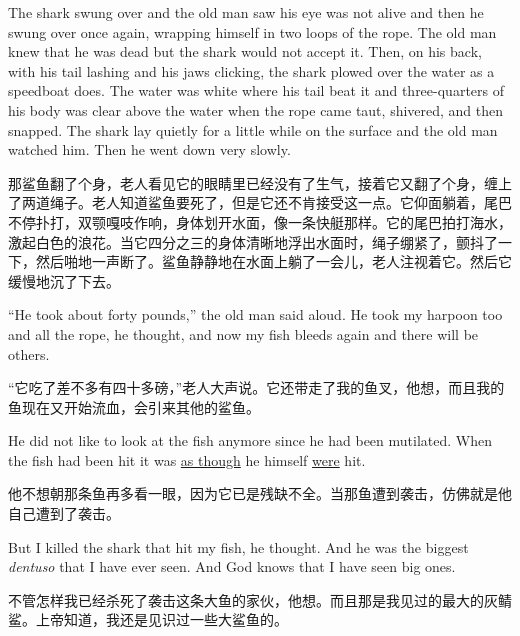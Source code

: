 \begin{paracol}{2}
\switchcolumn*

The shark swung over and the old man saw his eye was not alive and then he
swung over once again, wrapping himself in two loops of the rope. The old
man knew that he was dead but the shark would not accept it. Then, on his
back, with his tail lashing and his jaws clicking, the shark \gls{plowed}
over the water as a \gls{speedboat} does. The water was white where his tail
beat it and three-\glspl{quarter} of his body was clear above the water when the
rope came taut, \gls{shivered}, and then \gls{snapped}. The shark lay
quietly for a little while on the surface and the old man watched him. Then
he went down very slowly.

\switchcolumn

那鲨鱼翻了个身，老人看见它的眼睛里已经没有了生气，接着它又翻了个身，缠上了两道绳子。老人知道鲨鱼要死了，但是它还不肯接受这一点。它仰面躺着，尾巴不停扑打，双颚嘎吱作响，身体划开水面，像一条快艇那样。它的尾巴拍打海水，激起白色的浪花。当它四分之三的身体清晰地浮出水面时，绳子绷紧了，颤抖了一下，然后啪地一声断了。鲨鱼静静地在水面上躺了一会儿，老人注视着它。然后它缓慢地沉了下去。

\switchcolumn*

``He took about forty pounds,'' the old man said aloud. He took my harpoon
too and all the rope, he thought, and now my fish bleeds again and there
will be others.

\switchcolumn

“它吃了差不多有四十多磅，”老人大声说。它还带走了我的鱼叉，他想，而且我的鱼现在又开始流血，会引来其他的鲨鱼。

\switchcolumn*

He did not like to look at the fish anymore since he had been
\gls{mutilated}. When the fish had been hit it was \uline{as though} he himself
\uline{were} hit.

\switchcolumn

他不想朝那条鱼再多看一眼，因为它已是残缺不全。当那鱼遭到袭击，仿佛就是他自己遭到了袭击。

\switchcolumn*

But I killed the shark that hit my fish, he thought. And he was the biggest
\emph{dentuso} that I have ever seen. And God knows that I have seen big ones.

\switchcolumn

不管怎样我已经杀死了袭击这条大鱼的家伙，他想。而且那是我见过的最大的灰鲭鲨。上帝知道，我还是见识过一些大鲨鱼的。

\switchcolumn*


\end{paracol}

